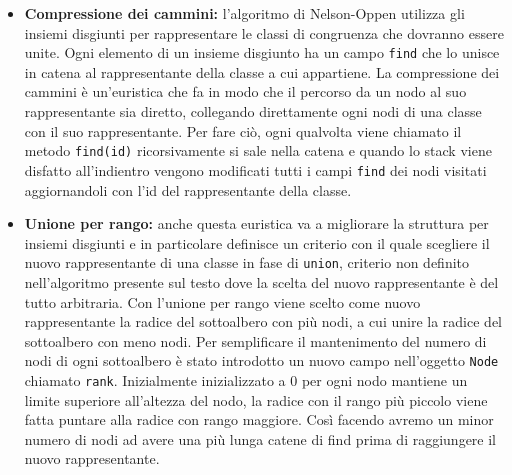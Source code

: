 \documentclass[a4paper,11pt]{article}
\begin{document}
\begin{itemize}
	\item {\bf Compressione dei cammini:} l'algoritmo di Nelson-Oppen utilizza gli insiemi disgiunti per rappresentare le classi di congruenza che dovranno essere unite. Ogni elemento di un insieme disgiunto ha un campo {\tt find} che lo unisce in catena al rappresentante della classe a cui appartiene.
La compressione dei cammini è un'euristica che fa in modo che il percorso da un nodo al suo rappresentante sia diretto, collegando direttamente ogni nodi di una classe con il suo rappresentante.
Per fare ciò, ogni qualvolta viene chiamato il metodo {\tt find(id)} ricorsivamente si sale nella catena e quando lo stack viene disfatto all'indientro vengono modificati tutti i campi {\tt find} dei nodi visitati aggiornandoli con l'id del rappresentante della classe.
	\item {\bf Unione per rango:} anche questa euristica va a migliorare la struttura per insiemi disgiunti e in particolare definisce un criterio con il quale scegliere il nuovo rappresentante di una classe in fase di {\tt union}, criterio non definito nell'algoritmo presente sul testo dove la scelta del nuovo rappresentante è del tutto arbitraria.
Con l'unione per rango viene scelto come nuovo rappresentante la radice del sottoalbero con più nodi, a cui unire la radice del sottoalbero con meno nodi. Per semplificare il mantenimento del numero di nodi di ogni sottoalbero è stato introdotto un nuovo campo nell'oggetto {\tt Node} chiamato {\tt rank}.
Inizialmente inizializzato a 0 per ogni nodo mantiene un limite superiore all'altezza del nodo, la radice con il rango più piccolo viene fatta puntare alla radice con rango maggiore.
Così facendo avremo un minor numero di nodi ad avere una più lunga catene di find prima di raggiungere il nuovo rappresentante. 


\end{itemize}
\end{document}
